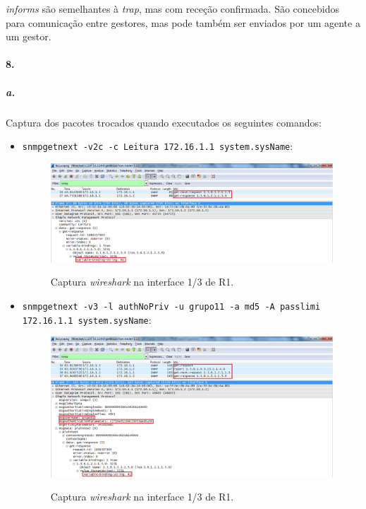 \emph{informs} são semelhantes à \emph{trap}, mas com receção confirmada. São concebidos para comunicação entre gestores, mas pode também ser enviados por um agente a um gestor.


\paragraph{8.}

\subparagraph{a.}
Captura dos pacotes trocados quando executados os seguintes comandos:

\begin{itemize}

\item \texttt{snmpgetnext -v2c -c Leitura 172.16.1.1 system.sysName}:

\begin{figure}[h]
\centering
\includegraphics[width=1\textwidth, height=0.28\textheight]{8a1.png}
\label{fig:14-capturaWireshark}
\caption{Captura \emph{wireshark} na interface \textsf{1/3} de \textsf{R1}.}
\end{figure}


\item \texttt{snmpgetnext -v3 -l authNoPriv -u grupo11 -a md5 -A passlimi 172.16.1.1 system.sysName}:

\begin{figure}[h]
\centering
\includegraphics[width=1\textwidth, height=0.35\textheight]{8a2.png}
\label{fig:15-capturaWireshark}
\caption{Captura \emph{wireshark} na interface \textsf{1/3} de \textsf{R1}.}
\end{figure}



\end{itemize}

